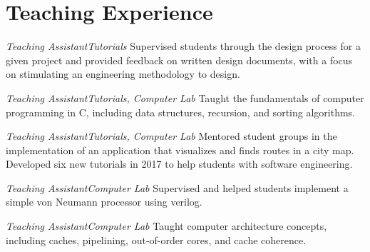 \section{\sc Teaching Experience}

{\textit{Teaching Assistant}}{\textit{Tutorials}}
{
  Supervised students through the design process for a given project and provided feedback on written design documents, with a focus on stimulating an engineering methodology to design.
}

{\textit{Teaching Assistant}}{\textit{Tutorials, Computer Lab}}
{
  Taught the fundamentals of computer programming in C, including data structures, recursion, and sorting algorithms.
}

{\textit{Teaching Assistant}}{\textit{Tutorials, Computer Lab}}
{
  Mentored student groups in the implementation of an application that visualizes and finds routes in a city map.
  Developed six new tutorials in 2017 to help students with software engineering.
}

{\textit{Teaching Assistant}}{\textit{Computer Lab}}
{
  Supervised and helped students implement a simple von Neumann processor using verilog.
}

{\textit{Teaching Assistant}}{\textit{Computer Lab}}
{
  Taught computer architecture concepts, including caches, pipelining, out-of-order cores, and cache coherence.
}
